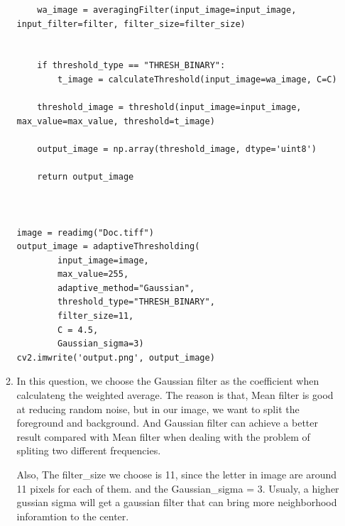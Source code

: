 \documentclass[12pt]{article}
\begin{document}
\begin{enumerate}[leftmargin=\labelsep]
\begin{enumerate}
\begin{lstlisting}
    wa_image = averagingFilter(input_image=input_image, input_filter=filter, filter_size=filter_size)


    if threshold_type == "THRESH_BINARY":
        t_image = calculateThreshold(input_image=wa_image, C=C)

    threshold_image = threshold(input_image=input_image, max_value=max_value, threshold=t_image)

    output_image = np.array(threshold_image, dtype='uint8')

    return output_image



image = readimg("Doc.tiff")
output_image = adaptiveThresholding(
        input_image=image, 
        max_value=255, 
        adaptive_method="Gaussian",         
        threshold_type="THRESH_BINARY", 
        filter_size=11, 
        C = 4.5, 
        Gaussian_sigma=3)
cv2.imwrite('output.png', output_image)
\end{lstlisting}

\item In this question, we choose the Gaussian filter as the coefficient when calculateng the weighted average. The reason is that, Mean filter is good at reducing random noise, but in our image, we want to split the foreground and background. And Gaussian filter can achieve a better result compared with Mean filter when dealing with the problem of spliting two different frequencies.

Also, The filter\_size we choose is 11, since the letter in image are around 11 pixels for each of them. and the Gaussian\_sigma = 3. Usualy, a higher gussian sigma will get a gaussian filter that can bring more neighborhood inforamtion to the center.


\end{enumerate}
\end{enumerate}
\end{document}
